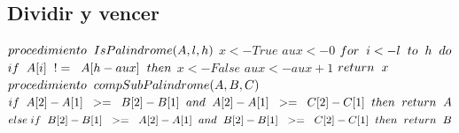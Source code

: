 \documentclass{article}
\begin{document}
\subsection{Dividir y vencer}
\(procedimiento\hspace{0,2cm}IsPalindrome(A, l, h)\)\newline
\indent\(x<-True\)\newline
\indent\(aux<-0\)\newline
\indent\(for\hspace{0,2cm}i<-l\hspace{0,2cm}to\hspace{0,2cm}h\hspace{0,2cm}do\)\newline
\indent\indent\(if\hspace{0,2cm}A[i]\hspace{0,2cm}!=\hspace{0,2cm}A[h-aux]\hspace{0,2cm}then\)\newline
\indent\indent\indent\(x<-False\)\newline
\indent\indent\(aux<-aux+1\)\newline
\indent\(return\hspace{0,2cm}x\)\newline
\newline
\(procedimiento\hspace{0,2cm}compSubPalindrome(A,B,C)\)\newline
\indent\(if\hspace{0,2cm}A[2]-A[1]\hspace{0,2cm}>=\hspace{0,2cm}B[2]-B[1]\hspace{0,2cm}and\hspace{0,2cm}A[2]-A[1]\hspace{0,2cm}>=\hspace{0,2cm}C[2]-C[1]\hspace{0,2cm}then\hspace{0,2cm}return\hspace{0,2cm}A\)\newline
\indent\(else\hspace{0,1cm}if\hspace{0,2cm}B[2]-B[1]\hspace{0,2cm}>=\hspace{0,2cm}A[2]-A[1]\hspace{0,2cm}and\hspace{0,2cm}B[2]-B[1]\hspace{0,2cm}>=\hspace{0,2cm}C[2]-C[1]\hspace{0,2cm}then\hspace{0,2cm}return\hspace{0,2cm}B\)\newline
\end{document}
